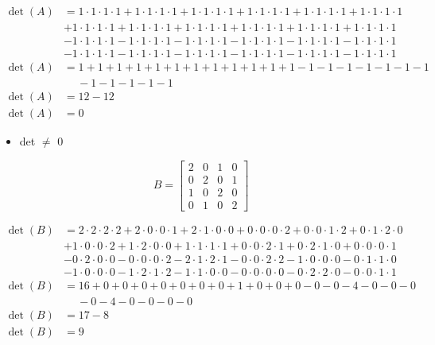 \documentclass[12pt]{article}
\begin{document}
\[
\begin{aligned}
\operatorname{det}(A) & = 1 \cdot 1 \cdot 1 \cdot 1 + 1 \cdot 1 \cdot 1 \cdot 1 + 1 \cdot 1 \cdot 1 
\cdot 1 + 1 \cdot 1 \cdot 1 \cdot 1 + 1 \cdot 1 \cdot 1 \cdot 1 + 1 \cdot 1 \cdot 1 \cdot 1\\
& + 1 \cdot 1 \cdot 1 \cdot 1 + 1 \cdot 1 \cdot 1 \cdot 1 + 1 \cdot 1 \cdot 1 \cdot 1 + 1 \cdot 1 
\cdot 1 \cdot 1 + 1 \cdot 1 \cdot 1 \cdot 1 + 1 \cdot 1 \cdot 1 \cdot 1\\
& - 1 \cdot 1 \cdot 1 \cdot 1 - 1 \cdot 1 \cdot 1 \cdot 1 - 1 \cdot 1 \cdot 1 \cdot 1 - 1 \cdot 1 
\cdot 1 \cdot 1 - 1 \cdot 1 \cdot 1 \cdot 1 - 1 \cdot 1 \cdot 1 \cdot 1\\
& - 1 \cdot 1 \cdot 1 \cdot 1 - 1 \cdot 1 \cdot 1 \cdot 1 - 1 \cdot 1 \cdot 1 \cdot 1 - 1 \cdot 1 
\cdot 1 \cdot 1 - 1 \cdot 1 \cdot 1 \cdot 1 - 1 \cdot 1 \cdot 1 \cdot 1 \\ 
\operatorname{det}(A) & = 1 + 1 + 1 + 1 + 1 + 1 + 1 + 1 + 1 + 1 + 1 + 1 - 1 - 1 - 1 - 1 - 1 - 1 - 1 \\ & \quad \ - 1 - 1 - 1 - 1 - 1 \\
\operatorname{det}(A) & = 12-12 \\
\operatorname{det}(A) & = 0
\end{aligned}
\]

\begin{itemize}
    \item det $\neq$ 0
\end{itemize}
\[
  B =
  \left[ {\begin{array}{cccc}
    2 & 0 & 1 & 0\\
    0 & 2 & 0 & 1\\
    1 & 0 & 2 & 0\\
    0 & 1 & 0 & 2
  \end{array} } \right]
\]

\[
\begin{aligned}
\operatorname{det}(B) & = 2 \cdot 2 \cdot 2 \cdot 2 + 2 \cdot 0 \cdot 0 \cdot 1 + 2 \cdot 1 \cdot 0 
\cdot 0 + 0 \cdot 0 \cdot 0 \cdot 2 + 0 \cdot 0 \cdot 1 \cdot 2 + 0 \cdot 1 \cdot 2 \cdot 0 \\
&  + 1 \cdot 0 \cdot 0 \cdot 2 + 1 \cdot 2 \cdot 0 \cdot 0 + 1 \cdot 1 \cdot 1 \cdot 1 + 0 \cdot 0 
\cdot 2 \cdot 1 + 0 \cdot 2 \cdot 1 \cdot 0 + 0 \cdot 0 \cdot 0 \cdot 1 \\
& - 0 \cdot 2 \cdot 0 \cdot 0 - 0 \cdot 0 \cdot 0 \cdot 2 - 2 \cdot 1 \cdot 2 \cdot 1 - 0 \cdot 0 
\cdot 2 \cdot 2 - 1 \cdot 0 \cdot 0 \cdot 0 - 0 \cdot 1 \cdot 1 \cdot 0 \\
& - 1 \cdot 0 \cdot 0 \cdot 0 - 1 \cdot 2 \cdot 1 \cdot 2 - 1 \cdot 1 \cdot 0 \cdot 0 - 0 \cdot 0 
\cdot 0 \cdot 0 - 0 \cdot 2 \cdot 2 \cdot 0 - 0 \cdot 0 \cdot 1 \cdot 1\\ 
\operatorname{det}(B) & = 16 + 0 + 0 + 0 + 0 + 0 + 0 + 0 + 1 + 0 + 0 + 0 - 0 - 0 - 4 - 0 - 0 - 0 \\ & \quad \ - 0 - 4 - 0 - 0 - 0 - 0 \\
\operatorname{det}(B) & = 17-8 \\
\operatorname{det}(B) & = 9
\end{aligned}
\]
\end{document}
